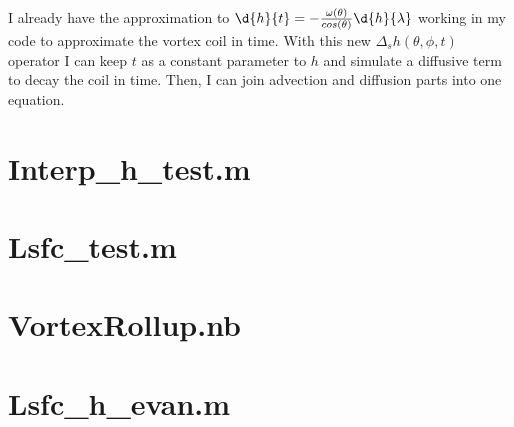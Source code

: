 \documentclass[letter,10pt]{article}
\begin{document}
I already have the approximation to $\d{h}{t} = - \frac{\omega(\theta) }{ cos(\theta)}\d{h}{\lambda}$ working in my code to approximate the vortex coil in time. With this new $\Delta_{s} h(\theta,\phi,t)$ operator I can keep $t$ as a constant parameter to $h$ and simulate a diffusive term to decay the coil in time. Then, I can join advection and diffusion parts into one equation. 

\clearpage

\appendix

\section{Interp\_h\_test.m}
\label{app:Interp_h_test.m}
\clearpage

\section{Lsfc\_test.m}
\label{app:Lsfc_test.m}
\clearpage

\section{VortexRollup.nb}
\label{app:VortexRollup.nb}

\clearpage

\section{Lsfc\_h\_evan.m}
\label{app:Lsfc_h_evan.m}
\clearpage
\end{document}

